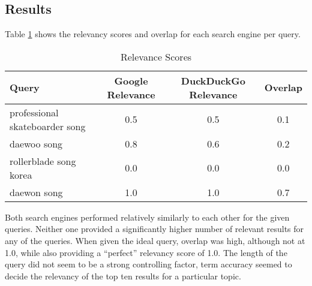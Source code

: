 \subsection{Results}
Table \ref{tab:11comparison} shows the relevancy scores and overlap for each search engine per query.

\begin{table}[h!]
\centering
\begin{tabular}{| l | c | c | c |}
\hline
Query & Google Relevance & DuckDuckGo Relevance & Overlap \\
\hline
professional skateboarder song & 0.5 & 0.5 & 0.1 \\
daewoo song & 0.8 & 0.6 & 0.2 \\
rollerblade song korea & 0.0 & 0.0 & 0.0 \\
daewon song & 1.0 & 1.0 & 0.7 \\
\hline
\end{tabular}
\caption{Relevance Scores}
\label{tab:11comparison}
\end{table}

Both search engines performed relatively similarly to each other for the given queries.  Neither one provided a significantly higher number of relevant results for any of the queries.  When given the ideal query, overlap was high, although not at 1.0, while also providing a ``perfect'' relevancy score of 1.0.  The length of the query did not seem to be a strong controlling factor, term accuracy seemed to decide the relevancy of the top ten results for a particular topic.